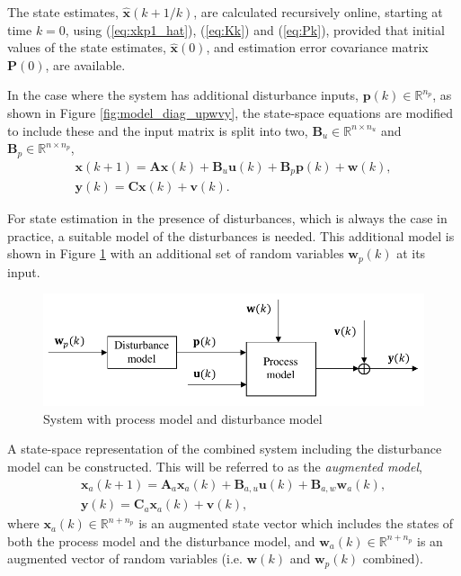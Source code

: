 The state estimates, $\mathbf{\hat{x}}(k+1/k)$, are calculated recursively online, starting at time $k=0$, using (\ref{eq:xkp1_hat}), (\ref{eq:Kk}) and (\ref{eq:Pk}), provided that initial values of the state estimates, $\mathbf{\hat{x}}(0)$, and estimation error covariance matrix $\mathbf{P}(0)$, are available.

In the case where the system has additional disturbance inputs, $\mathbf{p}(k) \in \mathbb{R}^{n_p}$, as shown in Figure \ref{fig:model_diag_upwvy}, the state-space equations are modified to include these and the input matrix is split into two, $\mathbf{B}_u \in \mathbb{R}^{n \times n_u}$ and $\mathbf{B}_p \in \mathbb{R}^{n \times n_p}$,
\begin{equation} \label{eq:ss_rep_upwy}
	\begin{aligned}
		\mathbf{x}(k+1) = \mathbf{A} \mathbf{x}(k) + \mathbf{B}_u \mathbf{u}(k) + \mathbf{B}_p \mathbf{p}(k) + \mathbf{w}(k), \\
		\mathbf{y}(k) = \mathbf{C} \mathbf{x}(k) + \mathbf{v}(k).
	\end{aligned}
\end{equation}

For state estimation in the presence of disturbances, which is always the case in practice, a suitable model of the disturbances is needed. This additional model is shown in Figure \ref{fig:model_diag_wpupwvy} with an additional set of random variables $\mathbf{w}_p(k)$ at its input.

\begin{figure}[htp]
	\centering
	\includegraphics[width=12.5cm]{images/model_diag_wpupwvy.pdf}
	\caption{System with process model and disturbance model}
	\label{fig:model_diag_wpupwvy}
\end{figure}

A state-space representation of the combined system including the disturbance model can be constructed. This will be referred to as the \textit{augmented model},
\begin{equation} \label{eq:ss_rep_xa}
	\begin{aligned}
		\mathbf{x}_a(k+1) = \mathbf{A}_a \mathbf{x}_a(k) + \mathbf{B}_{a,u} \mathbf{u}(k) + \mathbf{B}_{a,w} \mathbf{w}_{a}(k), \\
		\mathbf{y}(k) = \mathbf{C}_a \mathbf{x}_a(k) + \mathbf{v}(k),
	\end{aligned}
\end{equation}
where $\mathbf{x}_a(k) \in \mathbb{R}^{n+n_p}$ is an augmented state vector which includes the states of both the process model and the disturbance model, and $\mathbf{w}_a(k) \in \mathbb{R}^{n+n_p}$ is an augmented vector of random variables (i.e. $\mathbf{w}(k)$ and $\mathbf{w}_p(k)$ combined).



